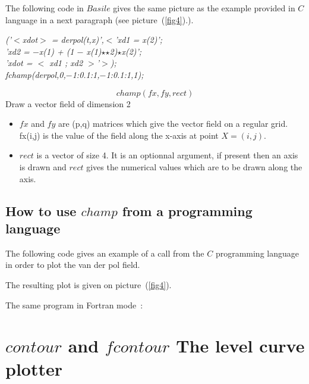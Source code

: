 \def\cmarg{\hspace{1cm}}

The following code in $Basile$ gives the same picture as the example provided 
 in $C$ language in a next paragraph (see picture~(\ref{fig4}).).
\begin{flushleft}
{\sl 
\cmarg \hspace{1.2cm}{\bf deff}('$<$xdot$>$ = derpol(t,x)',$<$'xd1 = x(2)';\\ 
\cmarg \hspace{1.2cm}'xd2 = $-$x(1) + (1 $-$ x(1)$\star$$\star$2)$\star$x(2)';\\ 
\cmarg \hspace{1.2cm}'xdot = $<$ xd1 ; xd2 $>$'$>$);\\ 
\cmarg \hspace{1.5cm}fchamp(derpol,0,$-$1:0.1:1,$-$1:0.1:1,1);\\ }
\end{flushleft}

\[ 
   champ(fx,fy,rect)
\]
Draw a vector field of dimension 2
\begin{itemize}
\item $fx$ and $fy$ are (p,q) matrices which give the vector field 
  on a regular grid. fx(i,j) is the value of the field along the x-axis
  at point $X=(i,j)$.
\item $rect$ is a vector of size 4. It is an optionnal argument, if present
	 then an axis is drawn and $rect$ gives the numerical values 
	which are to be drawn along the axis.
\end{itemize}

\subsection{How to use $champ$ from a programming language}
The following code 
 gives an example of a call from the $C$ programming language in order 
 to plot the van der pol field. 

 

The resulting plot is given on picture~(\ref{fig4}).


The same program in Fortran mode~:

 

\section{ $contour$ and $fcontour$ The level curve plotter}

